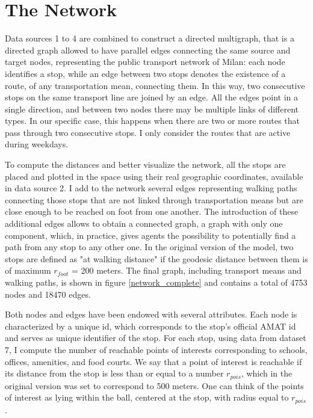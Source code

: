 
\section{The Network}\label{sec:3.2}

Data sources 1 to 4 are combined to construct a directed multigraph, that is a directed graph allowed to have parallel edges connecting the same source and target nodes, representing the public transport network of Milan: each node identifies a stop, while an edge between two stops denotes the existence of a route, of any transportation mean, connecting them. In this way, two consecutive stops on the same transport line are joined by an edge. All the edges point in a single direction, and between two nodes there may be multiple links of different types. In our specific case, this happens when there are two or more routes that pass through two consecutive stops. I only consider the routes that are active during weekdays.

To compute the distances and better visualize the network, all the stops are placed and plotted in the space using their real geographic coordinates, available in data source 2.  
I add to the network several edges representing walking paths connecting those stops that are not linked through transportation means but are close enough to be reached on foot from one another. The introduction of these additional edges allows to obtain a connected graph, a graph with only one component, which, in practice, gives agents the possibility to potentially find a path from any stop to any other one. In the original version of the model, two stops are defined as "at walking distance" if the geodesic distance between them is of maximum $r_{foot}$ = 200 meters. The final graph, including transport means and walking paths, is shown in figure \ref{network_complete} and contains a total of 4753 nodes and 18470 edges. 

Both nodes and edges have been endowed with several attributes.
Each node is characterized by a unique id, which corresponds to the stop's official AMAT id and serves as unique identifier of the stop. For each stop, using data from dataset 7, I compute the number of reachable points of interests corresponding to schools, offices, amenities, and food courts. We say that a point of interest is reachable if its distance from the stop is less than or equal to a number $r_{pois}$, which in the original version was set to correspond to 500 meters. One can think of the points of interest as lying within the ball, centered at the stop, with radius equal to $r_{pois}$.  
 
